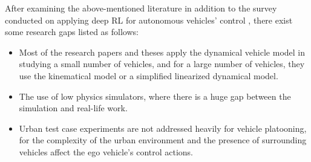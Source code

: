 After examining the above-mentioned literature in addition to the survey conducted on applying deep RL for autonomous vehicles’ control \cite{aradi2020survey}, there exist some research gaps listed as follows:

\begin{itemize}
    \item Most of the research papers and theses apply the dynamical vehicle model in studying a small number of vehicles, and for a large number of vehicles, they use the kinematical model or a simplified linearized dynamical model.
    \item The use of low physics simulators, where there is a huge gap between the simulation and real-life work.
    \item Urban test case experiments are not addressed heavily for vehicle platooning, for the complexity of the urban environment and the presence of surrounding vehicles affect the ego vehicle’s control actions.
\end{itemize}

